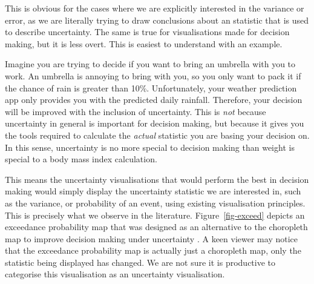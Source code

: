 \documentclass[
  12pt]{article}
\begin{document}
This is obvious for the cases where we are explicitly interested in the
variance or error, as we are literally trying to draw conclusions about
an statistic that is used to describe uncertainty. The same is true for
visualisations made for decision making, but it is less overt. This is
easiest to understand with an example.

Imagine you are trying to decide if you want to bring an umbrella with
you to work. An umbrella is annoying to bring with you, so you only want
to pack it if the chance of rain is greater than 10\%. Unfortunately,
your weather prediction app only provides you with the predicted daily
rainfall. Therefore, your decision will be improved with the inclusion
of uncertainty. This is \emph{not} because uncertainty in general is
important for decision making, but because it gives you the tools
required to calculate the \emph{actual} statistic you are basing your
decision on. In this sense, uncertainty is no more special to decision
making than weight is special to a body mass index calculation.

This means the uncertainty visualisations that would perform the best in
decision making would simply display the uncertainty statistic we are
interested in, such as the variance, or probability of an event, using
existing visualisation principles. This is precisely what we observe in
the literature. Figure~\ref{fig-exceed} depicts an exceedance
probability map that was designed as an alternative to the choropleth
map to improve decision making under uncertainty
\citep{Kuhnert2018, Lucchesi2021}. A keen viewer may notice that the
exceedance probability map is actually just a choropleth map, only the
statistic being displayed has changed. We are not sure it is productive
to categorise this visualisation as an uncertainty visualisation.
\end{document}
